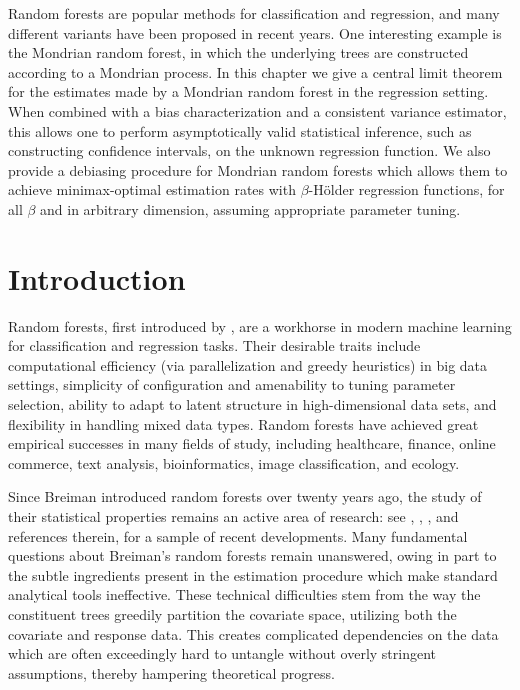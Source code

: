 \documentclass[11pt,lof]{puthesis}
\theoremstyle{break}
\theoremstyle{proof}
\begin{document}
Random forests are popular methods for classification and regression, and many
different variants have been proposed in recent years. One interesting example
is the Mondrian random forest, in which the underlying trees are constructed
according to a Mondrian process. In this chapter we give a central limit theorem
for the estimates made by a Mondrian random forest in the regression setting.
When combined with a bias characterization and a consistent variance estimator,
this allows one to perform asymptotically valid statistical inference, such as
constructing confidence intervals, on the unknown regression function. We also
provide a debiasing procedure for Mondrian random forests which allows them to
achieve minimax-optimal estimation rates with $\beta$-H{\"o}lder regression
functions, for all $\beta$ and in arbitrary dimension, assuming appropriate
parameter tuning.

\section{Introduction}

Random forests, first introduced by \citet{breiman2001random}, are a workhorse
in modern machine learning for classification and regression tasks.
Their desirable traits include computational efficiency (via parallelization
and greedy heuristics) in big data settings, simplicity of configuration and
amenability to tuning parameter selection, ability to adapt to latent structure
in high-dimensional data sets, and flexibility in handling mixed data types.
Random forests have achieved great empirical successes in many fields of study,
including healthcare, finance, online commerce, text analysis, bioinformatics,
image classification, and ecology.

Since Breiman introduced random forests over twenty years ago, the study of
their statistical properties remains an active area of research: see
\citet{scornet2015consistency}, \citet{chi2022asymptotic},
\citet{klusowski2024large}, and references therein, for a sample of recent
developments. Many fundamental questions about Breiman's random forests remain
unanswered, owing in part to the subtle ingredients present in the estimation
procedure which make standard analytical tools ineffective. These technical
difficulties stem from the way the constituent trees greedily partition the
covariate space, utilizing both the covariate and response data. This creates
complicated dependencies on the data which are often exceedingly hard to
untangle without overly stringent assumptions, thereby hampering theoretical
progress.
\end{document}
